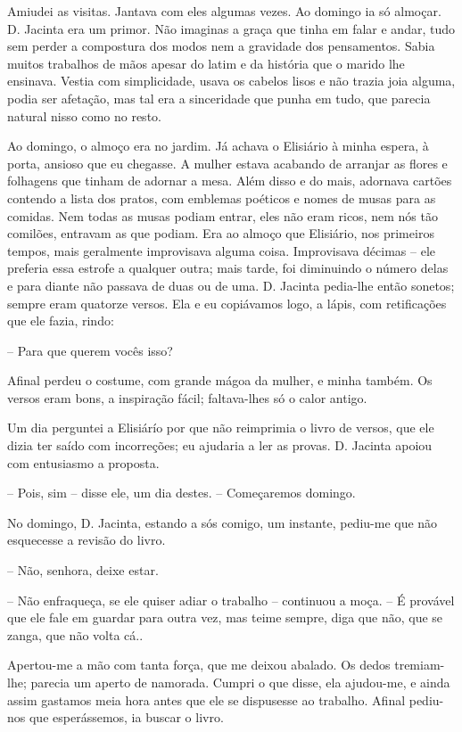 Amiudei as visitas. Jantava com eles algumas vezes. Ao domingo ia só
almoçar. D. Jacinta era um primor. Não imaginas a graça que tinha em
falar e andar, tudo sem perder a compostura dos modos nem a gravidade
dos pensamentos. Sabia muitos trabalhos de mãos apesar do latim e da
história que o marido lhe ensinava. Vestia com simplicidade, usava os
cabelos lisos e não trazia joia alguma, podia ser afetação, mas tal era
a sinceridade que punha em tudo, que parecia natural nisso como no
resto.

Ao domingo, o almoço era no jardim. Já achava o Elisiário à minha
espera, à porta, ansioso que eu chegasse. A mulher estava acabando de
arranjar as flores e folhagens que tinham de adornar a mesa. Além disso
e do mais, adornava cartões contendo a lista dos pratos, com emblemas
poéticos e nomes de musas para as comidas. Nem todas as musas podiam
entrar, eles não eram ricos, nem nós tão comilões, entravam as que
podiam. Era ao almoço que Elisiário, nos primeiros tempos, mais
geralmente improvisava alguma coisa. Improvisava décimas -- ele preferia
essa estrofe a qualquer outra; mais tarde, foi diminuindo o número delas
e para diante não passava de duas ou de uma. D. Jacinta pedia-lhe então
sonetos; sempre eram quatorze versos. Ela e eu copiávamos logo, a lápis,
com retificações que ele fazia, rindo:

-- Para que querem vocês isso?

Afinal perdeu o costume, com grande mágoa da mulher, e minha também. Os
versos eram bons, a inspiração fácil; faltava-lhes só o calor antigo.

Um dia perguntei a Elisiárío por que não reimprimia o livro de versos,
que ele dizia ter saído com incorreções; eu ajudaria a ler as provas. D.
Jacinta apoiou com entusiasmo a proposta.

-- Pois, sim -- disse ele, um dia destes. -- Começaremos domingo.

No domingo, D. Jacinta, estando a sós comigo, um instante, pediu-me que
não esquecesse a revisão do livro.

-- Não, senhora, deixe estar.

-- Não enfraqueça, se ele quiser adiar o trabalho -- continuou a moça.
-- É provável que ele fale em guardar para outra vez, mas teime sempre,
diga que não, que se zanga, que não volta cá..

Apertou-me a mão com tanta força, que me deixou abalado. Os dedos
tremiam-lhe; parecia um aperto de namorada. Cumpri o que disse, ela
ajudou-me, e ainda assim gastamos meia hora antes que ele se dispusesse
ao trabalho. Afinal pediu-nos que esperássemos, ia buscar o livro.

